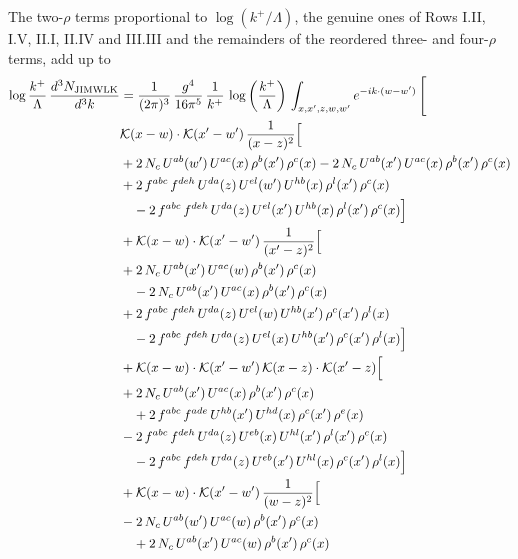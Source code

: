 The two-$\rho$ terms proportional to $\log(k^+/\Lambda)$, the genuine ones of Rows I.II, I.V, II.I, II.IV and III.III and the remainders of the reordered three- and four-$\rho$ terms, add up to
\begin{align}\label{eq:JIMWLKrho}
\log\frac{k^+}{\Lambda}\,\frac{d^{3}N_{\rm JIMWLK}}{d^{3}k} & = \frac{1}{(2\pi)^{3}}\,\frac{g^{4}}{16\pi^{5}}\,\frac{1}{k^{+}}\,\log{\left(\frac{k^{+}}{\Lambda}\right)}\,\int_{x,x',z,w,w'}e^{-ik\cdot(w-w')}\,\Bigg[
\notag \\ & \mathcal{K}(x-w)\cdot\mathcal{K}(x'-w')\,\frac{1}{(x-z)^{2}}\Big[\notag\\
&+2\,N_{c}\,U^{ab}(w')\,U^{ac}(x)\,\rho^{b}(x')\,\rho^{c}(x) -2\,N_{c}\,U^{ab}(x')\,U^{ac}(x)\,\rho^{b}(x')\,\rho^{c}(x)\notag\\
& +2\,f^{abc}\,f^{deh}\,U^{da}(z)\,U^{el}(w')\,U^{hb}(x)\,\rho^{l}(x')\,\rho^{c}(x) \notag\\
&\quad -2\,f^{abc}\,f^{deh}\,U^{da}(z)\,U^{el}(x')\,U^{hb}(x)\,\rho^{l}(x')\,\rho^{c}(x)\Big]\notag\\
& +\mathcal{K}(x-w)\cdot\mathcal{K}(x'-w')\,\frac{1}{(x'-z)^{2}}\Big[\notag\\
& +2\,N_{c}\,U^{ab}(x')\,U^{ac}(w)\,\rho^{b}(x')\,\rho^{c}(x)\notag\\
&\quad -2\,N_{c}\,U^{ab}(x')\,U^{ac}(x)\,\rho^{b}(x')\,\rho^{c}(x)\notag\\
& +2\,f^{abc}\,f^{deh}\,U^{da}(z)\,U^{el}(w)\,U^{hb}(x')\,\rho^{c}(x')\,\rho^{l}(x) \notag\\
&\quad -2\,f^{abc}\,f^{deh}\,U^{da}(z)\,U^{el}(x)\,U^{hb}(x')\,\rho^{c}(x')\,\rho^{l}(x)\Big]\notag\\
& +\mathcal{K}(x-w)\cdot\mathcal{K}(x'-w')\,\mathcal{K}(x-z)\cdot\mathcal{K}(x'-z)\Big[\notag\\
& +2\,N_{c}\,U^{ab}(x')\,U^{ac}(x)\,\rho^{b}(x')\,\rho^{c}(x)\notag\\
&\quad +2\,f^{abc}\,f^{ade}\,U^{hb}(x')\,U^{hd}(x)\,\rho^{c}(x')\,\rho^{e}(x)\notag\\
& -2\,f^{abc}\,f^{deh}\,U^{da}(z)\,U^{eb}(x)\,U^{hl}(x')\,\rho^{l}(x')\,\rho^{c}(x) \notag\\
&\quad -2\,f^{abc}\,f^{deh}\,U^{da}(z)\,U^{eb}(x')\,U^{hl}(x)\,\rho^{c}(x')\,\rho^{l}(x)\Big]\notag\\
& +\mathcal{K}(x-w)\cdot\mathcal{K}(x'-w')\,\frac{1}{(w-z)^{2}}\Big[\notag\\
& -2\,N_{c}\,U^{ab}(w')\,U^{ac}(w)\,\rho^{b}(x')\,\rho^{c}(x)\notag\\
&\quad +2\,N_{c}\,U^{ab}(x')\,U^{ac}(w)\,\rho^{b}(x')\,\rho^{c}(x)\notag\\

\end{align}
